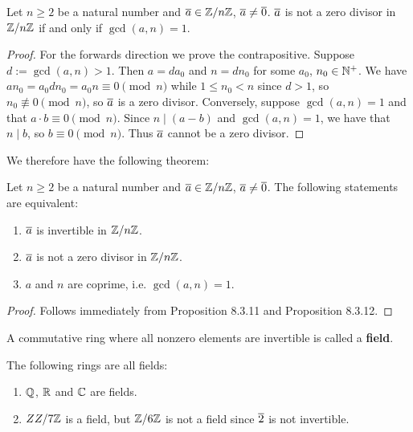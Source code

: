 \begin{propbox}
   Let $n \geq 2$ be a natural number and $\overline{a} \in \mathbb{Z}/n\mathbb{Z}$, $\overline{a} \neq \overline{0}$. $\overline{a}$ is not a zero divisor in $\mathbb{Z}/n\mathbb{Z}$ if and only if $\gcd(a,n) = 1$. 
\end{propbox}
\begin{proof}
   For the forwards direction we prove the contrapositive. Suppose $d := \gcd(a,n) > 1$. Then $a = da_0$ and $n = dn_0$ for some $a_0$, $n_0 \in \mathbb{N}^+$. We have $an_0 = a_0dn_0 = a_0n \equiv 0 \pmod{n}$ while $1 \leq n_0 < n$ since $d > 1$, so $n_0 \not\equiv 0 \pmod{n}$, so $\overline{a}$ is a zero divisor. Conversely, suppose $\gcd(a,n) = 1$ and that $a \cdot b \equiv 0 \pmod{n}$. Since $n \mid (a-b)$ and $\gcd(a,n) = 1$, we have that $n \mid b$, so $b \equiv 0 \pmod{n}$. Thus $\overline{a}$ cannot be a zero divisor.
\end{proof}

We therefore have the following theorem:

\begin{thmbox}
   Let $n \geq 2$ be a natural number and $\overline{a} \in \mathbb{Z}/n\mathbb{Z}$, $\overline{a} \neq \overline{0}$. The following statements are equivalent:
   \begin{enumerate}
      \item $\overline{a}$ is invertible in $\mathbb{Z}/n\mathbb{Z}$.
      \item $\overline{a}$ is not a zero divisor in $\mathbb{Z}/n\mathbb{Z}$.
      \item $a$ and $n$ are coprime, i.e. $\gcd(a,n) = 1$. 
   \end{enumerate}
\end{thmbox}
\begin{proof}
   Follows immediately from Proposition 8.3.11 and Proposition 8.3.12. 
\end{proof}

\begin{defbox}
   A commutative ring where all nonzero elements are invertible is called a \textbf{field}.
\end{defbox}

\begin{example}
   The following rings are all fields:
   \begin{enumerate}
      \item $\mathbb{Q}$, $\mathbb{R}$ and $\mathbb{C}$ are fields.
   \item $ZZ/7\mathbb{Z}$ is a field, but $\mathbb{Z}/6\mathbb{Z}$ is not a field since $\overline{2}$ is not invertible.
   \end{enumerate}
\end{example}


